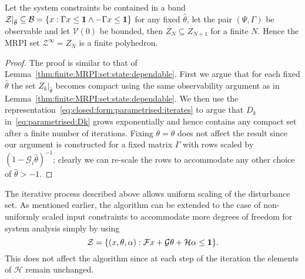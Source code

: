 %
\begin{thm}
Let the system constraints be contained in a band $\mathcal Z\vert_{\hat\theta}\subseteq\mathcal 
B=\{x:\Gamma x\leq {\bf{1}}\wedge -\Gamma x\leq {\bf{1}}\}$ for any fixed $\hat\theta$, let the
pair $(\Psi,\Gamma)$ be observable and let $\mathcal V(0)$ be bounded, then $Z_N\subseteq Z_{N+1}$
for a finite $N$. Hence the MRPI set $\mathcal Z^\infty = Z_N$ is a finite polyhedron.
\end{thm}
%
\begin{proof}
The proof is similar to that of Lemma~\ref{thm:finite:MRPI:set:state:dependable}.
First we argue that for each fixed $\hat\theta$ the set $Z_k\vert_{\hat\theta}$ becomes compact using the same
observability argument as in Lemma~\ref{thm:finite:MRPI:set:state:dependable}.
We then use the representation~\eqref{eq:closed:form:parametrised:iterates} to argue that $D_k$ 
in~\eqref{eq:parametrised:Dk} grows exponentially and hence contains any compact set after a finite number
of iterations. Fixing $\theta=\hat\theta$ does not affect the result since
our argument is constructed for a fixed matrix $\Gamma$ with rows scaled by 
$(1-\mathcal G_i\hat\theta)^{-1}$; clearly we can re-scale the rows to accommodate any other choice of $\hat\theta>-1$.
\end{proof}

The iterative process described above allows uniform scaling of the disturbance set. As mentioned earlier, the 
algorithm can be extended to the case of non-uniformly scaled input constraints to accommodate more degrees of freedom for 
system analysis simply by using 
%
\[
\mathcal Z = \{(x,\theta,\alpha): \mathcal F x + \mathcal G\theta + 
\mathcal H \alpha \leq {\bf{1}}\}.
\]
%
This does not affect the algorithm since at each step of the iteration 
the elements of $\mathcal H$ remain unchanged. 

